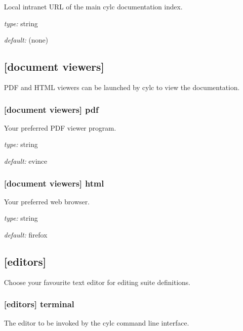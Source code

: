 Local intranet URL of the main cylc documentation index.

\begin{myitemize}
\item {\em type:} string
\item {\em default:} (none)
\end{myitemize}

\subsection{[document viewers]}

PDF and HTML viewers can be launched by cylc to view the documentation.

\subsubsection[pdf]{[document viewers] \textrightarrow pdf}

Your preferred PDF viewer program.

\begin{myitemize}
\item {\em type:} string
\item {\em default:} evince
\end{myitemize}

\subsubsection[html]{[document viewers] \textrightarrow html}

Your preferred web browser.

\begin{myitemize}
\item {\em type:} string
\item {\em default:} firefox
\end{myitemize}

\subsection{[editors]}

Choose your favourite text editor for editing suite definitions.

\subsubsection[terminal]{[editors] \textrightarrow terminal}

The editor to be invoked by the cylc command line interface.

